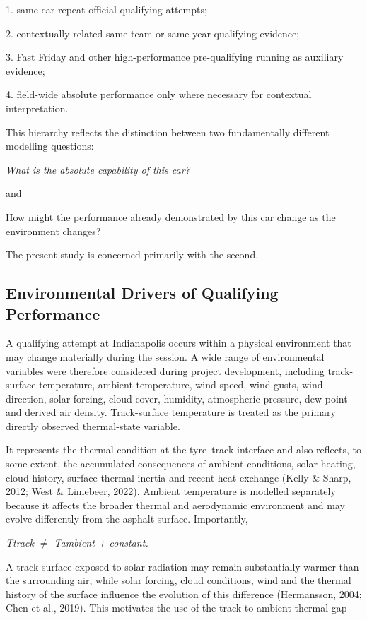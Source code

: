 1. same-car repeat official qualifying attempts;

2. contextually related same-team or same-year qualifying evidence;

3. Fast Friday and other high-performance pre-qualifying running as auxiliary evidence;

4. field-wide absolute performance only where necessary for contextual interpretation.

This hierarchy reflects the distinction between two fundamentally different modelling questions:

\begin{center}\textit{What is the absolute capability of this car?}\end{center}

and

How might the performance already demonstrated by this car change as the environment changes?

The present study is concerned primarily with the second.

\subsection{Environmental Drivers of Qualifying Performance}
A qualifying attempt at Indianapolis occurs within a physical environment that may change materially during the session. A wide range of environmental variables were therefore considered during project development, including track-surface temperature, ambient temperature, wind speed, wind gusts, wind direction, solar forcing, cloud cover, humidity, atmospheric pressure, dew point and derived air density. Track-surface temperature is treated as the primary directly observed thermal-state variable.

It represents the thermal condition at the tyre--track interface and also reflects, to some extent, the accumulated consequences of ambient conditions, solar heating, cloud history, surface thermal inertia and recent heat exchange (Kelly \& Sharp, 2012; West \& Limebeer, 2022). Ambient temperature is modelled separately because it affects the broader thermal and aerodynamic environment and may evolve differently from the asphalt surface. Importantly,

\begin{center}\textit{Ttrack \ensuremath{\neq} Tambient + constant.}\end{center}

A track surface exposed to solar radiation may remain substantially warmer than the surrounding air, while solar forcing, cloud conditions, wind and the thermal history of the surface influence the evolution of this difference (Hermansson, 2004; Chen et al., 2019). This motivates the use of the track-to-ambient thermal gap

